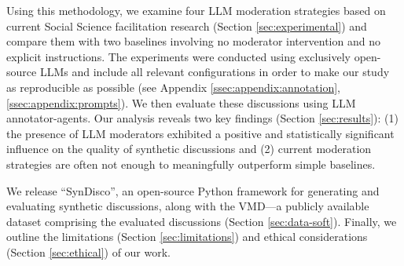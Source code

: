 Using this methodology, we examine four \ac{LLM} moderation strategies based on current Social Science facilitation research (Section \ref{sec:experimental})
and compare them with two baselines involving no moderator intervention and no explicit instructions. The experiments were conducted using exclusively open-source \acp{LLM} and include all relevant configurations in order to make our study as reproducible as possible (see Appendix \ref{ssec:appendix:annotation}, \ref{ssec:appendix:prompts}). We then evaluate these discussions using \ac{LLM} annotator-agents. Our analysis reveals two key findings (Section \ref{sec:results}): (1) the presence of \ac{LLM} moderators exhibited a positive and statistically significant influence on the quality of synthetic discussions and (2) current moderation strategies are often not enough to meaningfully outperform simple baselines. %

We release “SynDisco”, an open-source Python framework for generating and evaluating synthetic discussions, along with the \acf{VMD}\datasetlink—a publicly available dataset comprising the evaluated discussions (Section \ref{sec:data-soft}). Finally, we outline the limitations (Section \ref{sec:limitations}) and ethical considerations (Section \ref{sec:ethical}) of our work.